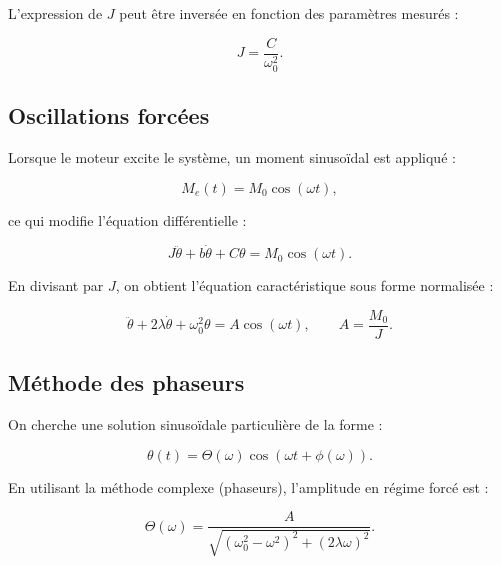L’expression de $J$ peut être inversée en fonction des paramètres mesurés :

\begin{equation}
J = \frac{C}{\omega_0^2}.
\label{eq:J}
\end{equation}


\subsection{Oscillations forcées} \label{subsec:osc_forcees}

Lorsque le moteur excite le système, un moment sinusoïdal est appliqué :

\begin{equation}
M_e(t) = M_0 \cos(\omega t),
\label{eq:moment_excitation}
\end{equation}

ce qui modifie l'équation différentielle :

\begin{equation}
J\ddot{\theta} + b\dot{\theta} + C\theta = M_0\cos(\omega t).
\label{eq:equa_forcee_brut}
\end{equation}

En divisant par $J$, on obtient l'équation caractéristique sous forme normalisée :

\begin{equation}
\ddot{\theta} + 2\lambda \dot{\theta} + \omega_0^2 \theta
= A\cos(\omega t),
\qquad A = \frac{M_0}{J}.
\label{eq:equa_forcee_normalisee}
\end{equation}


\subsection{Méthode des phaseurs} \label{subsec:phaseurs}

On cherche une solution sinusoïdale particulière de la forme :

\begin{equation}
\theta(t) = \Theta(\omega)\cos(\omega t + \phi(\omega)).
\label{eq:solution_phaseurs}
\end{equation}

En utilisant la méthode complexe (phaseurs), l'amplitude en régime forcé est :

\begin{equation}
\Theta(\omega)
= \frac{A}{\sqrt{(\omega_0^2 - \omega^2)^2 + (2\lambda\omega)^2}}.
\label{eq:amplitude_forcee}
\end{equation}

